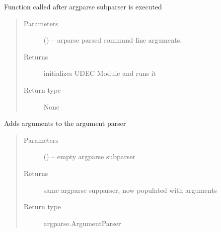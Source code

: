 \documentclass[letterpaper,10pt,english]{sphinxmanual}
\begin{document}

\begin{fulllineitems}
\label{\detokenize{MouseReferenceManual:Modules.Module_OSTRICH.parserHandler}}
Function called after argparse subparser is executed
\begin{quote}\begin{description}
\item[{Parameters}] \leavevmode
{} () -- arparse parsed command line arguments.

\item[{Returns}] \leavevmode
initializes UDEC Module and runs it

\item[{Return type}] \leavevmode
None

\end{description}\end{quote}

\end{fulllineitems}


\begin{fulllineitems}
\label{\detokenize{MouseReferenceManual:Modules.Module_OSTRICH.populateArgumentParser}}
Adds arguments to the argument parser
\begin{quote}\begin{description}
\item[{Parameters}] \leavevmode
{} () -- empty argparse subparser

\item[{Returns}] \leavevmode
same argparse supparser, now populated with arguments

\item[{Return type}] \leavevmode
argparse.ArgumentParser

\end{description}\end{quote}

\end{fulllineitems}
\end{document}
